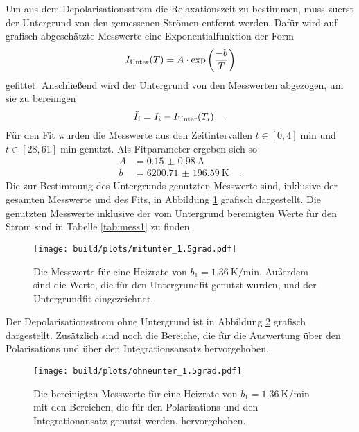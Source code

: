 \noindent
Um aus dem Depolarisationsstrom die Relaxationszeit zu bestimmen, muss zuerst der Untergrund von den gemessenen Strömen entfernt werden.
Dafür wird auf grafisch abgeschätzte Messwerte eine Exponentialfunktion der Form
\begin{equation}
  I_{\text{Unter}}(T) = A\cdot \exp\left(\frac{-b}{T}\right)
  \label{eqn:exp}
\end{equation}
gefittet. Anschließend wird der Untergrund von den Messwerten abgezogen, um sie zu bereinigen
\begin{equation*}
  \tilde{I_i} = I_i - I_{\text{Unter}}(T_i) \quad.
\end{equation*}
Für den Fit wurden die Messwerte aus den Zeitintervallen $t \in [0,4] \; \si{\minute}$ und $t \in [28,61] \; \si{\minute}$ genutzt.
Als Fitparameter ergeben sich so 
\begin{align*}
  A &= \SI{0.15(098)}{\ampere}\\
  b &= \SI{6200.71(19659)}{\kelvin} \quad .
\end{align*}
Die zur Bestimmung des Untergrunds genutzten Messwerte sind,
inklusive der gesamten Messwerte und des Fits, in Abbildung \ref{img:mitunter15} grafisch dargestellt. 
Die genutzten Messwerte inklusive der vom Untergrund bereinigten Werte für den Strom sind in Tabelle \ref{tab:mess1} zu finden.
\begin{figure}[h]
  \centering
  \texttt{[image: build/plots/mitunter\_1.5grad.pdf]}
  \caption{Die Messwerte für eine Heizrate von $b_1 = \SI{1.36}{\kelvin\per\minute}$. 
  Außerdem sind die Werte, die für den Untergrundfit genutzt wurden, und der Untergrundfit eingezeichnet.}
  \label{img:mitunter15}
\end{figure}

\noindent
Der Depolarisationsstrom ohne Untergrund ist in Abbildung \ref{img:ohneunter15} grafisch dargestellt. 
Zusätzlich sind noch die Bereiche, die für die Auswertung über den Polarisations und über den Integrationsansatz hervorgehoben.
\begin{figure}[H]
  \centering
  \texttt{[image: build/plots/ohneunter\_1.5grad.pdf]}
  \caption{Die bereinigten Messwerte für eine Heizrate von $b_1 = \SI{1.36}{\kelvin\per\minute}$ 
          mit den Bereichen, die für den Polarisations und den Integrationansatz genutzt werden, hervorgehoben.}
  \label{img:ohneunter15}
\end{figure}


